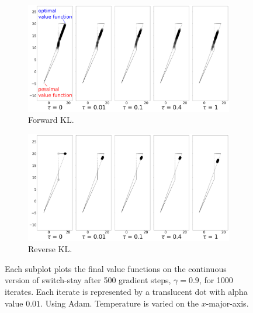 \documentclass[twoside,11pt]{article}
\begin{document}
\begin{figure}[ht]
  \centering
  \begin{subfigure}[b]{0.45\linewidth}
    \centering
    \includegraphics[width=\columnwidth]{figs/continuous-switch-stay/notlearnQ/cont_poly.png}
    \caption{Forward KL.}
    \label{fig:cont-switch-stay-forward}
  \end{subfigure}\hspace{15pt}%
  \begin{subfigure}[b]{0.45\linewidth}
        \centering
        \includegraphics[width=\columnwidth]{figs/continuous-switch-stay/notlearnQ/polytope_reverse_optim=adam_lr=0.005.png}
        \caption{Reverse KL.}
        \label{fig:cont-switch-stay-reverse}
  \end{subfigure}
  \caption{Each subplot plots the final value functions on the continuous version of switch-stay after 500 gradient steps, $\gamma = 0.9$, for 1000 iterates. Each iterate is represented by a translucent dot with alpha value $0.01$. Using Adam. Temperature is varied on the $x$-major-axis.}
\end{figure}


\end{document}
